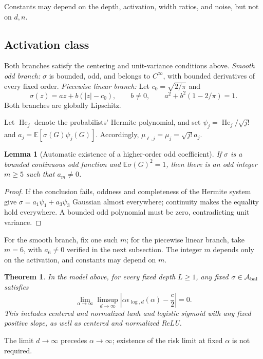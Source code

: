 \documentclass[a4paper]{tufte-handout}
\newtheorem{theorem}{Theorem}
\newtheorem{lemma}{Lemma}
\newcommand{\E}{\mathbb E}
\begin{document}
\begin{fullwidth}
Constants may depend on the depth, activation, width ratios, and noise, but not on $d,n$.

\subsection{Activation class}
Both branches satisfy the centering and unit-variance conditions above.
\emph{Smooth odd branch:} $\sigma$ is bounded, odd, and belongs to $C^\infty$, with bounded derivatives of every fixed order.
\emph{Piecewise linear branch:} Let $c_0=\sqrt{2/\pi}$ and
\begin{equation}\label{eq:pl}
\sigma(z)=az+b(|z|-c_0),\qquad
b\ne0,\qquad a^2+b^2(1-2/\pi)=1.
\end{equation}
Both branches are globally Lipschitz.

Let $\operatorname{He}_j$ denote the probabilists' Hermite polynomial, and set $\psi_j=\operatorname{He}_j/\sqrt{j!}$ and $a_j=\E[\sigma(G)\psi_j(G)]$.
Accordingly, $\mu_{\ell,j}=\mu_j=\sqrt{j!}a_j$.
\begin{lemma}[Automatic existence of a higher-order odd coefficient]\label{lem:automatic-hermite}
If $\sigma$ is a bounded continuous odd function and $\E\sigma(G)^2=1$, then there is an odd integer $m\ge5$ such that $a_m\ne0$.
\end{lemma}
\begin{proof}
If the conclusion fails, oddness and completeness of the Hermite system give
$\sigma=a_1\psi_1+a_3\psi_3$ Gaussian almost everywhere; continuity makes the equality hold everywhere.
A bounded odd polynomial must be zero, contradicting unit variance.
\end{proof}
For the smooth branch, fix one such $m$; for the piecewise linear branch, take $m=6$, with $a_6\ne0$ verified in the next subsection.
The integer $m$ depends only on the activation, and constants may depend on $m$.

\begin{theorem}\label{thm:main}
In the model above, for every fixed depth $L\ge1$, any fixed $\sigma\in\mathcal A_{\rm bal}$ satisfies
\begin{equation}\label{eq:main}
\boxed{\lim_{\alpha\to\infty}\limsup_{d\to\infty}
\left|\alpha \epsilon_{\log,d}(\alpha)-\frac c2\right|=0.}
\end{equation}
This includes centered and normalized tanh and logistic sigmoid with any fixed positive slope, as well as centered and normalized ReLU.
\end{theorem}
The limit $d\to\infty$ precedes $\alpha\to\infty$; existence of the risk limit at fixed $\alpha$ is not required.


\end{fullwidth}
\end{document}
